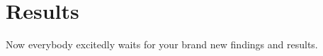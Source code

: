 
\chapter{Results}
\label{sec:results}
Now everybody excitedly waits for your brand new findings and results.